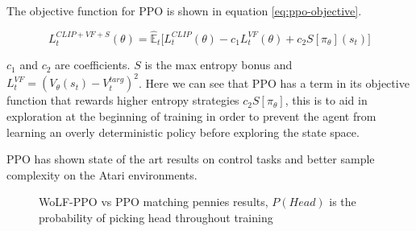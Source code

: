 \documentclass[conference]{IEEEtran}
\begin{document}
The objective function for PPO is shown in equation \ref{eq:ppo-objective}.

\begin{equation}
    L_t^{CLIP+VF+S}(\theta) = \hat{\mathbb{E}}_t\big[L_t^{CLIP}(\theta)-c_1L_t^{VF}(\theta)+c_2S[\pi_{\theta}](s_t)\big]
    \label{eq:ppo-objective}
\end{equation}

$c_1$ and $c_2$ are coefficients. $S$ is the max entropy bonus and $L_t^{VF} = (V_{\theta}(s_t)-V_t^{targ})^2$. Here we can see that PPO has a term in its objective function that rewards higher entropy strategies $c_2S[\pi_{\theta}]$, this is to aid in exploration at the beginning of training in order to prevent the agent from learning an overly deterministic policy before exploring the state space. 

PPO has shown state of the art results on control tasks and better sample complexity on the Atari environments.

\begin{figure}[htbp]
    \caption{WoLF-PPO vs PPO matching pennies results, $P(Head)$ is the probability of picking head throughout training}
\end{figure}
\end{document}
